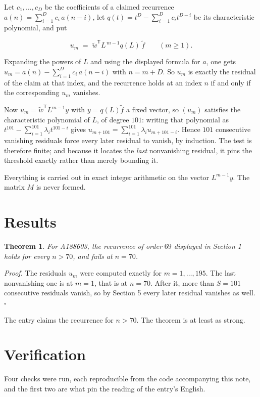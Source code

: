\documentclass[11pt]{article}
\newtheorem{theorem}{Theorem}
\theoremstyle{definition}
\begin{document}
Let $c_1,\dots,c_D$ be the coefficients of a claimed recurrence $a(n) = \sum_{i=1}^{D} c_i\,a(n-i)$, let $q(t) = t^{D} - \sum_{i=1}^{D} c_i t^{D-i}$ be its characteristic polynomial, and put

\[u_m \;=\; \tilde w^{\mathsf T} L^{\,m-1} q(L)\,\tilde f \qquad (m \ge 1).\]

Expanding the powers of $L$ and using the displayed formula for $a$, one gets $u_m = a(n) - \sum_{i=1}^{D} c_i\,a(n-i)$ with $n = m + D$. So $u_m$ is exactly the residual of the claim at that index, and the recurrence holds at an index $n$ if and only if the corresponding $u_m$ vanishes.

Now $u_m = \tilde w^{\mathsf T} L^{m-1} y$ with $y = q(L)\tilde f$ a fixed vector, so $(u_m)$ satisfies the characteristic polynomial of $L$, of degree $101$: writing that polynomial as $t^{101} - \sum_{i=1}^{101} \lambda_i t^{101-i}$ gives $u_{m+101} = \sum_{i=1}^{101} \lambda_i u_{m+101-i}$. Hence $101$ consecutive vanishing residuals force every later residual to vanish, by induction. The test is therefore finite; and because it locates the {\itshape last} nonvanishing residual, it pins the threshold exactly rather than merely bounding it.

Everything is carried out in exact integer arithmetic on the vector $L^{m-1}y$. The matrix $M$ is never formed.

\section{Results}

\begin{theorem} For A188603, the recurrence of order $69$ displayed in Section 1 holds for every $n > 70$, and fails at $n = 70$.\end{theorem}

{\itshape Proof.} The residuals $u_m$ were computed exactly for $m = 1,\dots,195$. The last nonvanishing one is at $m = 1$, that is at $n = 70$. After it, more than $S = 101$ consecutive residuals vanish, so by Section 5 every later residual vanishes as well. $\square$

The entry claims the recurrence for $n > 70$. The theorem is at least as strong.

\section{Verification}

Four checks were run, each reproducible from the code accompanying this note, and the first two are what pin the reading of the entry's English.
\end{document}
